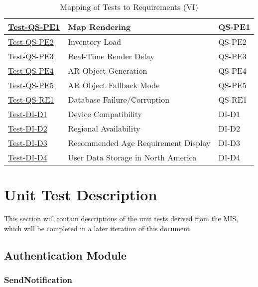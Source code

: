 \documentclass[12pt, titlepage]{article}
\begin{document}
\begin{table}[htpb!]
    \centering
    \begin{tabular}{|l|p{8cm}|p{3cm}|}
        \hline
        \hyperref[itm:Test-QS-PE1]{Test-QS-PE1} & Map Rendering & QS-PE1 \\
        \hline
        \hyperref[itm:Test-QS-PE2]{Test-QS-PE2} & Inventory Load & QS-PE2 \\
        \hline
        \hyperref[itm:Test-QS-PE3]{Test-QS-PE3} & Real-Time Render Delay & QS-PE3 \\
        \hline
        \hyperref[itm:Test-QS-PE4]{Test-QS-PE4} & AR Object Generation & QS-PE4 \\
        \hline
        \hyperref[itm:Test-QS-PE5]{Test-QS-PE5} & AR Object Fallback Mode & QS-PE5 \\
        \hline
        \hyperref[itm:Test-QS-RE1]{Test-QS-RE1} & Database Failure/Corruption & QS-RE1 \\
        \hline
        \hyperref[itm:Test-DI-D1]{Test-DI-D1} & Device Compatibility & DI-D1 \\
        \hline
        \hyperref[itm:Test-DI-D2]{Test-DI-D2} & Regional Availability & DI-D2 \\
        \hline
        \hyperref[itm:Test-DI-D3]{Test-DI-D3} & Recommended Age Requirement Display & DI-D3 \\
        \hline
        \hyperref[itm:Test-DI-D4]{Test-DI-D4} & User Data Storage in North America & DI-D4 \\
        \hline
    \end{tabular}
    \caption{Mapping of Tests to Requirements (VI)}
    \label{tab:test_requirements6}
\end{table}

\pagebreak


\section{Unit Test Description}

This section will contain descriptions of the unit tests derived from the MIS, which will be completed in a later iteration of this document

\subsection{Authentication Module}

\subsubsection{SendNotification}
\end{document}
